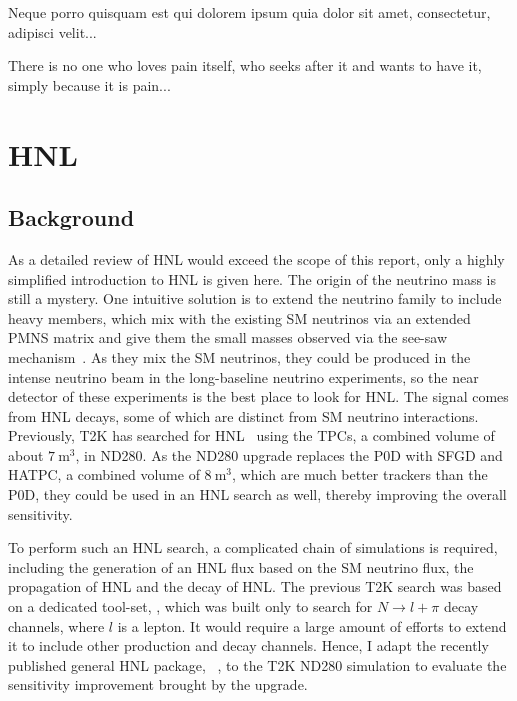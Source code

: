 \begin{savequote}[8cm]
\textlatin{Neque porro quisquam est qui dolorem ipsum quia dolor sit amet, consectetur, adipisci velit...}

There is no one who loves pain itself, who seeks after it and wants to have it, simply because it is pain...
\end{savequote}

\chapter{\label{ch:hnl}HNL} 

\minitoc

    \section{Background}
        As a detailed review of HNL would exceed the scope of this report, only a highly simplified introduction to HNL is given here. 
        The origin of the neutrino mass is still a mystery. 
        One intuitive solution is to extend the neutrino family to include heavy members, which mix with the existing SM neutrinos via an extended PMNS matrix and give them the small masses observed via the see-saw mechanism~\cite{Abada_2007}. 
        As they mix the SM neutrinos, they could be produced in the intense neutrino beam in the long-baseline neutrino experiments, so the near detector of these experiments is the best place to look for HNL. 
        The signal comes from HNL decays, some of which are distinct from SM neutrino interactions. 
        Previously, T2K has searched for HNL~\cite{T2K:2019jwa} using the TPCs, a combined volume of about $7~\textrm{m}^3$, in ND280. As 
        the ND280 upgrade replaces the P0D with SFGD and HATPC, a combined volume of $8~\textrm{m}^3$, which are much better trackers than the P0D, they could be used in an HNL search as well, thereby improving the overall sensitivity. 

        To perform such an HNL search, a complicated chain of simulations is required, including the generation of an HNL flux based on the SM neutrino flux, the propagation of HNL and the decay of HNL. 
        The previous T2K search was based on a dedicated tool-set, , which was built only to search for $N\rightarrow l + \pi$ decay channels, where $l$ is a lepton. 
        It would require a large amount of efforts to extend it to include other production and decay channels. 
        Hence, I adapt the recently published general HNL package, ~\cite{Plows:2022gxc}, to the T2K ND280 simulation to evaluate the sensitivity improvement brought by the upgrade.

